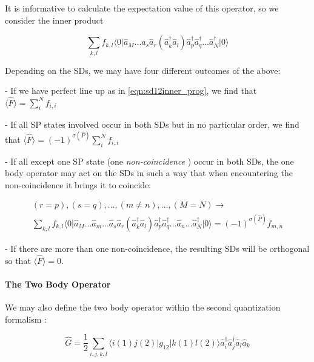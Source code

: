 It is informative to calculate the expectation value of this operator, so we consider the inner product

\begin{equation}
 \sum_{k,l} f_{k,l}  \langle 0\vert  \hat{a}_M ...  \hat{a}_s  \hat{a}_r ( \hat{a}_k^{\dagger} \hat{a}_l)  \hat{a}_p^\dagger \hat{a}_q^\dagger  ... \hat{a}_N^\dagger \vert 0 \rangle
\label{eqn:sd12inner_op}
\end{equation}

Depending on the SDs, we may have four different outcomes of the above:

- If we have perfect line up as in \ref{eqn:sd12inner_prog}, we find that $\langle \hat{F} \rangle = \sum_i^N f_{i,i}$

- If all SP states involved occur in both SDs but in no particular order, we find that $\langle \hat{F} \rangle =(-1)^{\sigma(\hat{P})} \sum_i^N f_{i,i}$

- If all except one SP state (one \emph{non-coincidence} \cite{ShavittBartlett2009}) occur in both SDs, the one body operator may act on the SDs in such a way that when encountering the non-coincidence it brings it to coincide:

\begin{multline}
(r=p), (s=q), ...,(m \neq n) , ... ,(M=N) \rightarrow \\ \sum_{k,l} f_{k,l}  \langle 0\vert  \hat{a}_M ...  \hat{a}_m ... \hat{a}_s  \hat{a}_r ( \hat{a}_k^{\dagger} \hat{a}_l)  \hat{a}_p^\dagger \hat{a}_q^\dagger  ... \hat{a}_n...\hat{a}_N^\dagger \vert 0 \rangle =(-1)^{\sigma(\hat{P})} f_{m,n}
\end{multline}
\label{eqn:sd12inner_noncoincide}

- If there are more than one non-coincidence, the resulting SDs will be orthogonal so that $\langle \hat{F} \rangle = 0$.




\paragraph{The Two Body Operator}

We may also define the two body operator within the second quantization formalism \cite{ShavittBartlett2009}:

\begin{equation}
\hat{G} = \frac{1}{2} \sum_{i,j,k,l} \langle i(1) j(2) \vert g_{12} \vert k(1) l(2) \rangle  \hat{a}_{i}^{\dagger}\hat{a}_{j}^{\dagger} \hat{a}_{l} \hat{a}_k
\label{eqn:twobody}
\end{equation}

